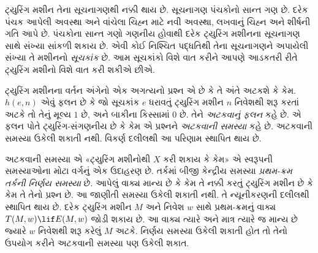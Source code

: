 ટ્યુરિંગ મશીન તેના સૂચનાગણથી નક્કી થાય છે. સૂચનાગણ પંચકોનો સાન્ત ગણ છે.
દરેક પંચક આપેલી અવસ્થા અને વાંચેલા ચિહ્ન માટે નવી અવસ્થા, લખવાનું ચિહ્ન
અને શીર્ષની ગતિ આપે છે. પંચકોના સાન્ત ગણો ગણનીય હોવાથી દરેક ટ્યુરિંગ
મશીનના સૂચનાગણ સાથે સંખ્યા સાંકળી શકાય છે. એવી કોઈ નિશ્ચિત પદ્ધતિથી તેના
સૂચનાગણને અપાયેલી સંખ્યા તે મશીનનો \emph{સૂચકાંક} છે. આમ સૂચકાંકો વિશે
વાત કરીને આપણે આડકતરી રીતે ટ્યુરિંગ મશીનો વિશે વાત કરી શકીએ છીએ.

ટ્યુરિંગ મશીનના વર્તન અંગેનો એક અગત્યનો પ્રશ્ન એ છે કે તે અંતે અટકશે કે
કેમ. $h(e,n)$ એવું ફલન છે કે જો સૂચકાંક $e$ ધરાવતું ટ્યુરિંગ મશીન
$n$ નિવેશથી શરૂ કરતાં અટકે તો તેનું મૂલ્ય $1$ છે, અને બાકીના કિસ્સામાં
$0$ છે. તેને \emph{અટકવાનું ફલન} કહે છે. એ ફલન પોતે
ટ્યુરિંગ-સંગણનીય છે કે કેમ એ પ્રશ્નને \emph{અટકવાની સમસ્યા} કહે છે.
અટકવાની સમસ્યા ઉકેલી શકાતી નથી. વિકર્ણ દલીલથી આ પરિણામ સ્થાપિત થાય છે.

અટકવાની સમસ્યા એ «ટ્યુરિંગ મશીનોથી $X$ કરી શકાય કે કેમ» એ સ્વરૂપની
સમસ્યાઓના મોટા વર્ગનું એક ઉદાહરણ છે. તર્કમાં બીજી કેન્દ્રીય સમસ્યા
\emph{પ્રથમ-ક્રમ તર્કની નિર્ણય સમસ્યા} છે. આપેલું વાક્ય માન્ય છે કે કેમ
તે નક્કી કરતું ટ્યુરિંગ મશીન છે કે કેમ તે તેનો પ્રશ્ન છે. આ જાણીતી
સમસ્યા ઉકેલી શકાતી નથી. તે ન્યૂનીકરણની દલીલથી સ્થાપિત થાય છે. દરેક ટ્યુરિંગ
મશીન $M$ અને નિવેશ $w$ સાથે પ્રથમ-ક્રમનું વાક્ય $T(M,w) \lif E(M,w)$
જોડી શકાય છે. આ વાક્ય ત્યારે અને માત્ર ત્યારે જ માન્ય છે જ્યારે $w$
નિવેશથી શરૂ કરેલું $M$ અટકે. નિર્ણય સમસ્યા ઉકેલી શકાતી હોત તો તેનો ઉપયોગ
કરીને અટકવાની સમસ્યા પણ ઉકેલી શકાત.

